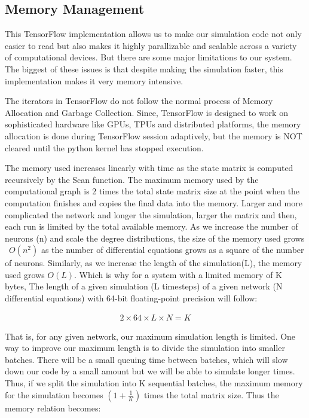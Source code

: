 \documentclass[10pt,letterpaper]{article}
\begin{document}
\subsection*{Memory Management}

This TensorFlow implementation allows us to make our simulation code not only easier to read but also makes it highly parallizable and scalable across a variety of computational devices. But there are some major limitations to our system. The biggest of these issues is that despite making the simulation faster, this implementation makes it very memory intensive.

The iterators in TensorFlow do not follow the normal process of Memory Allocation and Garbage Collection. Since, TensorFlow is designed to work on sophisticated hardware like GPUs, TPUs and distributed platforms, the memory allocation is done during TensorFlow session adaptively, but the memory is NOT cleared until the python kernel has stopped execution. 

The memory used increases linearly with time as the state matrix is computed recursively by the Scan function. The maximum memory used by the computational graph is 2 times the total state matrix size at the point when the computation finishes and copies the final data into the memory. Larger and more complicated the network and longer the simulation, larger the matrix and then, each run is limited by the total available memory. As we increase the number of neurons (n) and scale the degree distributions, the size of the memory used grows ~$O(n^2)$ as the number of differential equations grows as a square of the number of neurons. Similarly, as we increase the length of the simulation(L), the memory used grows $O(L)$. Which is why for a system with a limited memory of K bytes, The length of a given simulation (L timesteps) of a given network (N differential equations) with 64-bit floating-point precision will follow: 

\begin{eqnarray}2\times64\times L\times N=K\end{eqnarray}

That is, for any given network, our maximum simulation length is limited. One way to improve our maximum length is to divide the simulation into smaller batches. There will be a small queuing time between batches, which will slow down our code by a small amount but we will be able to simulate longer times. Thus, if we split the simulation into K sequential batches, the maximum memory for the simulation becomes $(1+\frac{1}{K})$ times the total matrix size. Thus the memory relation becomes:  
\end{document}
